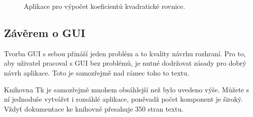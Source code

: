 \begin{figure}
  \begin{center}
  \end{center}
  \caption{Aplikace pro výpočet koeficientů kvadratické rovnice.}
  \label{fig:tk2}
\end{figure}

\subsection{Závěrem o GUI}
Tvorba GUI s sebou přináší jeden problém a to kvality návrhu rozhraní. Pro to, aby uživatel pracoval s GUI bez problémů, je nutné dodržovat zásady pro dobrý návrh aplikace. Toto je samozřejmě nad rámec toho to textu.

Knihovna Tk je samozřejmě mnohem obsáhlejší než bylo uvedeno výše. Můžete s ní jednoduše vytvářet i rozsáhlé aplikace, poněvadž počet komponent je široký. Vždyť dokumentace ke knihovně přesahuje 350 stran textu.



